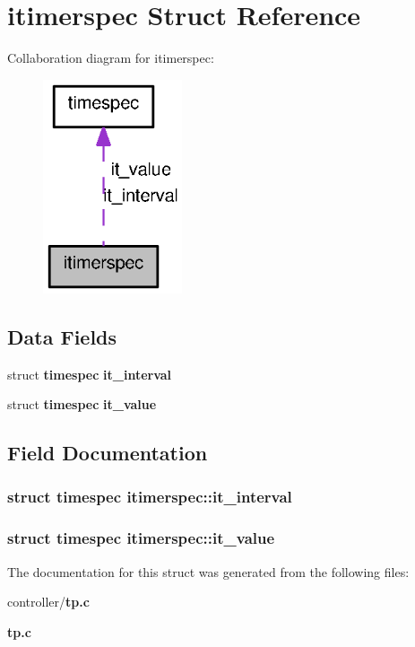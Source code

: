 \section{itimerspec Struct Reference}
\label{structitimerspec}


Collaboration diagram for itimerspec:
\nopagebreak
\begin{figure}[H]
\begin{center}
\leavevmode
\includegraphics[width=116pt]{structitimerspec__coll__graph}
\end{center}
\end{figure}
\subsection*{Data Fields}
\begin{DoxyCompactItemize}
\item 
struct {\bf timespec} {\bf it\_\-interval}
\item 
struct {\bf timespec} {\bf it\_\-value}
\end{DoxyCompactItemize}


\subsection{Field Documentation}
\subsubsection[{it\_\-interval}]{\setlength{\rightskip}{0pt plus 5cm}struct {\bf timespec} {\bf itimerspec::it\_\-interval}}\label{structitimerspec_a27cedae552e2b2fe0993c1b2c4ff1889}
\subsubsection[{it\_\-value}]{\setlength{\rightskip}{0pt plus 5cm}struct {\bf timespec} {\bf itimerspec::it\_\-value}}\label{structitimerspec_a754dda918053251c24558b07571d6e8f}


The documentation for this struct was generated from the following files:\begin{DoxyCompactItemize}
\item 
controller/{\bf tp.c}\item 
{\bf tp.c}\end{DoxyCompactItemize}
